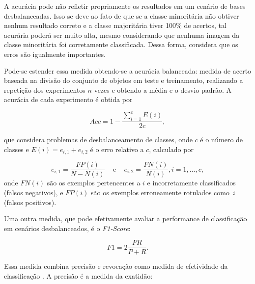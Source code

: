 A acurácia pode não refletir propriamente os resultados em um cenário de bases desbalanceadas. Isso se deve ao fato de que se a classe minoritária não obtiver nenhum resultado correto e a classe majoritária tiver 100\% de acertos, tal acurária poderá ser muito alta, mesmo considerando que nenhuma imagem da classe minoritária foi corretamente classificada. Dessa forma, considera que os erros são igualmente importantes.

Pode-se estender essa medida obtendo-se a acurácia balanceada: medida de acerto baseada na divisão do conjunto de objetos em teste e treinamento, realizando a repetição dos experimentos $n$ vezes e obtendo a média e o desvio padrão. A acurácia de cada experimento é obtida por

    \begin{equation*}
      Acc = 1 - \frac{\sum_{i=1}^{c} E(i)}{2c},
    \label{eq:Accuracy}
    \end{equation*}

    \noindent  que considera problemas de desbalanceamento de classes, onde $c$ é o número de classes e $E(i) = e_{i,1} + e_{i,2}$ é o erro relativo a $c$, calculado por

    \begin{equation*}
      e_{i,1} = \frac{FP(i)}{N-N(i)} \,\,\,\,\, \text{ e } \,\,\,\,\, e_{i,2} = \frac{FN(i)}{N(i)}, i=1,...,c,
    \label{eq:Errors}
    \end{equation*}
   \noindent onde $FN(i)$ são os exemplos pertencentes a $i$ e incorretamente classificados (falsos negativos), e $FP(i)$ são os exemplos erroneamente rotulados como~$i$ (falsos positivos).


Uma outra medida, que pode efetivamente avaliar a performance de classificação em cenários desbalanceados, é o \textit{F1-Score}:

\begin{equation*}
  F1 = 2 \frac{PR}{P+R}.
\end{equation*}

Essa medida combina precisão e revocação como medida de efetividade da classificação \cite{Garcia2009}. A precisão é a medida da exatidão:

